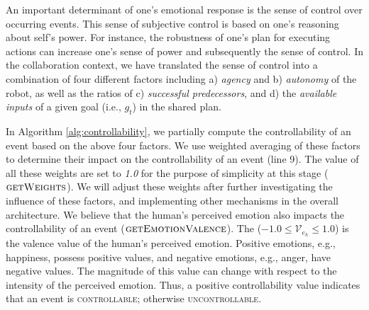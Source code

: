 An important determinant of one's emotional response is the sense of control
over occurring events. This sense of subjective control is based on one's
reasoning about self's power. For instance, the robustness of one's plan for
executing actions can increase one's sense of power and subsequently the sense
of control. In the collaboration context, we have translated the sense of control
into a combination of four different factors including a) \textit{agency} and b)
\textit{autonomy} of the robot, as well as the ratios of c) \textit{successful
predecessors}, and d) the \textit{available inputs} of a given goal
(i.e., $\mathit{g}_{t}$) in the shared plan.

In Algorithm \ref{alg:controllability}, we partially compute the controllability
of an event based on the above four factors. We use weighted averaging of these
factors to determine their impact on the controllability of an event (line 9).
The value of all these weights are set to \textit{1.0} for the purpose of
simplicity at this stage (\textbf{$\Call{getWeights}{}$}). We will adjust these
weights after further investigating the influence of these factors, and
implementing other mechanisms in the overall architecture. We believe that the
human's perceived emotion also impacts the controllability of an event
(\textbf{$\Call{getEmotionValence}{}$}). The ($-1.0 \leq \mathcal{V}_{e_h} \leq
1.0$) is the valence value of the human's perceived emotion. Positive emotions,
e.g., happiness, possess positive values, and negative emotions, e.g., anger,
have negative values. The magnitude of this value can change with respect to the
intensity of the perceived emotion. Thus, a positive controllability value
indicates that an event is \textsc{controllable}; otherwise
\textsc{uncontrollable}.

% 

